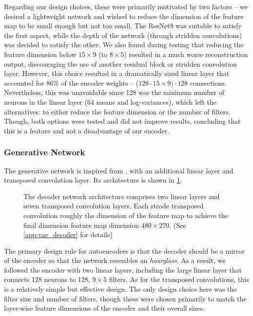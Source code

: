 Regarding our design choices, these were primarily motivated by two factors -- we desired a lightweight network and wished to reduce the dimension of the feature map to be small enough but not too small. 
The ResNet8 was suitable to satisfy the first aspect, while the depth of the network (through stridden convolutions) was decided to satisfy the other. We also found during testing that reducing the feature dimension below $15 \times 9$ (to $8 \times 5$) resulted in a much worse reconstruction output, discouraging the use of another residual block or stridden convolution layer.
However, this choice resulted in a dramatically sized linear layer that accounted for 86\% of the encoder weights -- ($128 \cdot 15\times9) \cdot 128$ connections.
Nevertheless, this was unavoidable since 128 was the minimum number of neurons in the linear layer (64 means and log-variances), which left the alternatives: to either reduce the feature dimension or the number of filters. Though, both options were tested and did not improve results, concluding that this is a feature and not a disadvantage of our encoder.


\subsubsection{Generative Network}
\label{subsubsec:5_vae_generative_network}
The generative network is inspired from \cite{vae_decoder_architecture}, with an additional linear layer and transposed convolution layer. Its architecture is shown in \cref{fig:5_decoder}. 
\begin{figure}[hbt]
    \centering
    \caption{The decoder network architecture comprises two linear layers and seven transposed convolution layers. Each strode transposed convolution roughly the dimension of the feature map to achieve the final dimension feature map dimension $480\times270$. (See \cref{app:vae_decoder} for details)}
    \label{fig:5_decoder}
\end{figure}
The primary design rule for autoencoders is that the decoder should be a mirror of the encoder so that the network resembles an \textit{hourglass}. As a result, we followed the encoder with two linear layers, including the large linear layer that connects 128 neurons to 128, $9\times5$ filters. As for the transposed convolutions, this is a relatively simple but effective design. The only design choice here was the filter size and number of filters, though these were chosen primarily to match the layer-wise feature dimensions of the encoder and their overall sizes.

